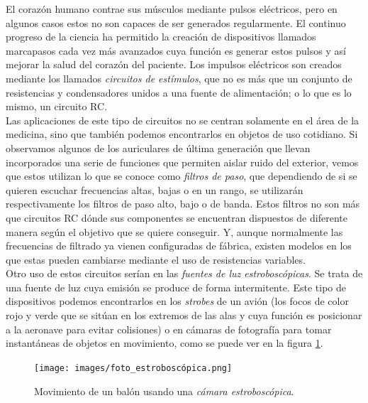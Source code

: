 \documentclass[../main.tex]{subfiles}
\begin{document}
El corazón humano contrae sus músculos mediante pulsos eléctricos, pero en algunos casos estos no son capaces de ser generados regularmente. El continuo progreso de la ciencia ha permitido la creación de dispositivos llamados marcapasos cada vez más avanzados cuya función es generar estos pulsos y así mejorar la salud del corazón del paciente. Los impulsos eléctricos son creados mediante los llamados \textit{circuitos de estímulos}, que no es más que un conjunto de resistencias y condensadores unidos a una fuente de alimentación; o lo que es lo mismo, un circuito RC. \cite{intro_circuitos_RC} \\

Las aplicaciones de este tipo de circuitos no se centran solamente en el área de la medicina, sino que también podemos encontrarlos en objetos de uso cotidiano. Si observamos algunos de los auriculares de última generación que llevan incorporados una serie de funciones que permiten aislar ruido del exterior, vemos que estos utilizan lo que se conoce como \textit{filtros de paso}, que dependiendo de si se quieren escuchar frecuencias altas, bajas o en un rango, se utilizarán respectivamente los filtros de paso alto, bajo o de banda. Estos filtros no son más que circuitos RC dónde sus componentes se encuentran dispuestos de diferente manera según el objetivo que se quiere conseguir. Y, aunque normalmente las frecuencias de filtrado ya vienen configuradas de fábrica, existen modelos en los que estas pueden cambiarse mediante el uso de resistencias variables.\\

Otro uso de estos circuitos serían en las \textit{fuentes de luz estroboscópicas}. Se trata de una fuente de luz cuya emisión se produce de forma intermitente. Este tipo de dispositivos podemos encontrarlos en los \textit{strobes} de un avión (los focos de color rojo y verde que se sitúan en los extremos de las alas y cuya función es posicionar a la aeronave para evitar colisiones) o en cámaras de fotografía para tomar instantáneas de objetos en movimiento, como se puede ver en la figura \ref{foto_estroboscópica}.\\

\begin{figure}[!h]
          \centering
          \texttt{[image: images/foto\_estroboscópica.png]}
          \caption{Movimiento de un balón usando una \textit{cámara estroboscópica}.}
          \label{foto_estroboscópica}
\end{figure}
\end{document}
